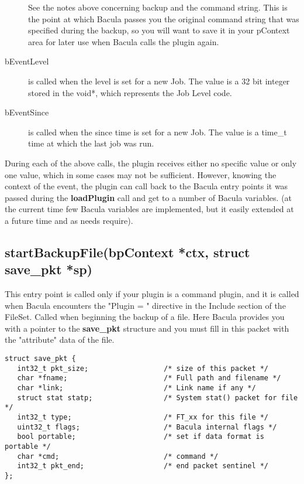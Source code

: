 \begin{description}
   See the notes above concerning backup and the command string. This is the
   point at which Bacula passes you the original command string that was
   specified during the backup, so you will want to save it in your pContext
   area for later use when Bacula calls the plugin again.

 \item [bEventLevel] is called when the level is set for a new Job. The value
   is a 32 bit integer stored in the void*, which represents the Job Level code.

 \item [bEventSince] is called when the since time is set for a new Job. The 
   value is a time\_t time at which the last job was run.
\end{description}

During each of the above calls, the plugin receives either no specific value or
only one value, which in some cases may not be sufficient.  However, knowing
the context of the event, the plugin can call back to the Bacula entry points
it was passed during the {\bf loadPlugin} call and get to a number of Bacula
variables.  (at the current time few Bacula variables are implemented, but it
easily extended at a future time and as needs require).

\subsection{startBackupFile(bpContext *ctx, struct save\_pkt *sp)}
This entry point is called only if your plugin is a command plugin, and 
it is called when Bacula encounters the "Plugin = " directive in
the Include section of the FileSet.
Called when beginning the backup of a file. Here Bacula provides you
with a pointer to the {\bf save\_pkt} structure and you must fill in 
this packet with the "attribute" data of the file.

\begin{verbatim}
struct save_pkt {
   int32_t pkt_size;                  /* size of this packet */
   char *fname;                       /* Full path and filename */
   char *link;                        /* Link name if any */
   struct stat statp;                 /* System stat() packet for file */
   int32_t type;                      /* FT_xx for this file */
   uint32_t flags;                    /* Bacula internal flags */
   bool portable;                     /* set if data format is portable */
   char *cmd;                         /* command */
   int32_t pkt_end;                   /* end packet sentinel */
};
\end{verbatim}

